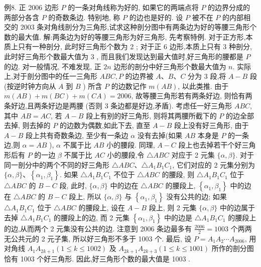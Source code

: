 例8. 正 2006 边形 $P$ 的一条对角线称为好的, 如果它的两端点将 $P$ 的边界分成的两部分各含 $P$ 的奇数条边.
特别地, 称 $P$ 的边也是好的.
设 $P$ 被不在 $P$ 的内部相交的 2003 条对角线剖分为三角形,试求这种剖分图中有两条边为好的等腰三角形个数的最大值.
解:两条边为好的等腰三角形为好三角形, 先考察特例.
对于正方形,本质上只有一种剖分, 此时好三角形个数为 2 ;
对于正 6 边形,本质上只有 3 种剖分, 此时好三角形个数最大值为 3 , 而且我们发现达到最大值时,好三角形的腰都是 $P$ 的边.
对一般情况, 不难发现, 正 $2 n$ 边形的剖分中好三角形个数最大值为 $n$.
实际上,对于剖分图中的任一三角形 $A B C, P$ 的边界被 $A 、 B 、 C$ 分为 3 段,将 $A-B$ 段 (按逆时钟方向从 $A$ 到 $B$ ) 所含 $P$ 的边数记作 $m(A B)$, 以此类推.
由于 $m(A B)+m(B C)+m(C A)=2006$, 故等腰三角形若有两条好边, 则恰有两条好边,且两条好边是两腰 (否则 3 条边都是好边,矛盾).
考虑任一好三角形 $A B C$, 其中 $A B=A C$, 若 $A-B$ 段上有别的好三角形, 则将其两腰所截下的 $P$ 的边全部去掉, 则去掉的 $P$ 的边数为偶数,如此下去, 直至 $A-B$ 段上没有好三角形, 由于 $A-B$ 段上共有奇数条边, 至少有一条边 $\alpha$ 没有去掉(如果 $A B$ 本身是 $P$ 的一条边,则 $\alpha=A B$ ), $\alpha$ 不属于比 $A B$ 小的腰段.
同理, $A-C$ 段上也去掉若干个好三角形后有 $P$ 的一边 $\beta$ 不属于比 $A C$ 小的腰段,令 $\triangle A B C$ 对应于 2 元集 $\{\alpha, \beta\}$.
对于同一剖分中的两个不同的好三角形 $\triangle A B C 、 \triangle A_1 B_1 C_1$, 它们对应的 2 元集分别为 $\{\alpha, \beta\} 、\left\{\alpha_1, \beta_1\right\}$. 如果 $\triangle A_1 B_1 C_1$ 不位于 $\triangle A B C$ 的腰段, 则 $\triangle A_1 B_1 C_1$ 位于 $\triangle A B C$ 的 $B-C$ 段, 此时, $\{\alpha, \beta\}$ 中的边在 $\triangle A B C$ 的腰段上, $\left\{\alpha_1, \beta_1\right\}$ 中的边在 $\triangle A B C$ 的 $B-C$ 段上, 所以 $\{\alpha, \beta\}$ 与 $\left\{\alpha_1, \beta_1\right\}$ 没有公共的边; 如果 $\triangle A_1 B_1 C_1$ 位于 $\triangle A B C$ 的腰段上, 设在 $A-B$ 段上, 则 2 元集 $\{\alpha, \beta\}$ 中的边属于去掉 $\triangle A_1 B_1 C_1$ 的腰段上的边, 而 2 元集 $\left\{\alpha_1, \beta_1\right\}$ 中的边是 $\triangle A_1 B_1 C_1$ 的腰段上的边,从而两个 2 元集没有公共的边.
注意到 2006 条边最多有 $\frac{2006}{2}=1003$ 个两两无公共元的 2 元子集, 所以好三角形不多于 1003 个.
最后, 设 $P=A_1 A_2 \cdots A_{2006}$, 用对角线 $A_1 A_{2 k+1}(1 \leqslant k \leqslant 1002)$ 及 $A_{2 k+1} A_{2 k+3} (1 \leqslant k \leqslant 1001)$ 所作的剖分图恰有 1003 个好三角形.
因此,好三角形个数的最大值是 1003 .



